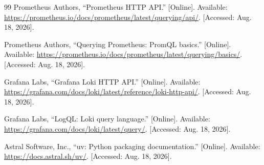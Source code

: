\documentclass[11pt,a4paper]{article}
\begin{document}
\begin{thebibliography}{99}
Prometheus Authors, ``Prometheus HTTP API.'' [Online].
Available: \url{https://prometheus.io/docs/prometheus/latest/querying/api/}. [Accessed: Aug. 18, 2026].

Prometheus Authors, ``Querying Prometheus: PromQL basics.'' [Online].
Available: \url{https://prometheus.io/docs/prometheus/latest/querying/basics/}. [Accessed: Aug. 18, 2026].

Grafana Labs, ``Grafana Loki HTTP API.'' [Online].
Available: \url{https://grafana.com/docs/loki/latest/reference/loki-http-api/}. [Accessed: Aug. 18, 2026].

Grafana Labs, ``LogQL: Loki query language.'' [Online].
Available: \url{https://grafana.com/docs/loki/latest/query/}. [Accessed: Aug. 18, 2026].

Astral Software, Inc., ``uv: Python packaging documentation.'' [Online].
Available: \url{https://docs.astral.sh/uv/}. [Accessed: Aug. 18, 2026].

\end{thebibliography}
\endgroup
\end{document}
